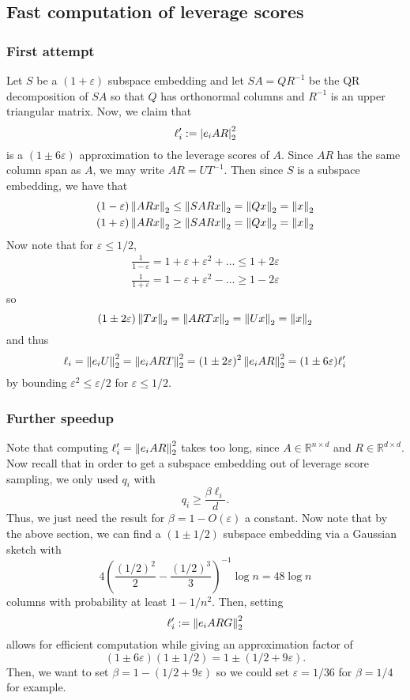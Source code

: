 \documentclass{article}
\begin{document}
\subsection{Fast computation of leverage scores}
\subsubsection{First attempt}
Let $S$ be a $(1+\varepsilon)$ subspace embedding and let $SA = QR^{-1}$ be the QR decomposition of $SA$ so that $Q$ has orthonormal columns and $R^{-1}$ is an upper triangular matrix. Now, we claim that
\[
	\ell_i' := \left\vert e_iAR\right\vert_2^2
\]
is a $(1\pm 6\varepsilon)$ approximation to the leverage scores of $A$. Since $AR$ has the same column span as $A$, we may write $AR = UT^{-1}$. Then since $S$ is a subspace embedding, we have that
\begin{align*}
	(1-\varepsilon)\left\Vert ARx\right\Vert_2\leq\left\Vert SARx\right\Vert_2 = \left\Vert Qx\right\Vert_2 = \left\Vert x\right\Vert_2 \\
	(1+\varepsilon)\left\Vert ARx\right\Vert_2\geq\left\Vert SARx\right\Vert_2 = \left\Vert Qx\right\Vert_2 = \left\Vert x\right\Vert_2
\end{align*}
Now note that for $\varepsilon\leq1/2$,
\begin{align*}
	\frac1{1-\varepsilon} = 1+\varepsilon+\varepsilon^2+\dots\leq 1+2\varepsilon \\
	\frac1{1+\varepsilon} = 1-\varepsilon+\varepsilon^2-\dots\geq 1-2\varepsilon
\end{align*}
so
\[
	(1\pm2\varepsilon)\left\Vert Tx\right\Vert_2 = \left\Vert ARTx\right\Vert_2 = \left\Vert Ux\right\Vert_2 = \left\Vert x\right\Vert_2
\]
and thus
\[
	\ell_i = \left\Vert e_iU\right\Vert_2^2 = \left\Vert e_iART\right\Vert_2^2 = (1\pm2\varepsilon)^2\left\Vert e_iAR\right\Vert_2^2 = (1\pm6\varepsilon)\ell_i'
\]
by bounding $\varepsilon^2\leq\varepsilon/2$ for $\varepsilon\leq1/2$. 

\subsubsection{Further speedup}
Note that computing $\ell_i' = \left\Vert e_i AR\right\Vert_2^2$ takes too long, since $A\in\mathbb R^{n\times d}$ and $R\in\mathbb R^{d\times d}$. Now recall that in order to get a subspace embedding out of leverage score sampling, we only used $q_i$ with
\[
	q_i\geq \frac{\beta\ell_i}{d}.
\]
Thus, we just need the result for $\beta = 1-O(\varepsilon)$ a constant. Now note that by the above section, we can find a $(1\pm1/2)$ subspace embedding via a Gaussian sketch with
\[
	4\left(\frac{(1/2)^2}2 - \frac{(1/2)^3}3\right)^{-1}\log n = 48\log n
\]
columns with probability at least $1-1/n^2$. Then, setting
\[
	\ell_i' := \left\Vert e_i ARG\right\Vert_2^2
\]
allows for efficient computation while giving an approximation factor of
\[
	(1\pm6\varepsilon)(1\pm1/2) = 1\pm(1/2+9\varepsilon).
\]
Then, we want to set $\beta = 1-(1/2+9\varepsilon)$ so we could set $\varepsilon = 1/36$ for $\beta = 1/4$ for example. 



\end{document}
